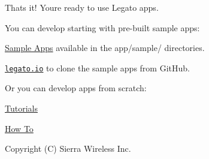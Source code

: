 That\textquotesingle{}s it! You\textquotesingle{}re ready to use Legato apps.

You can develop starting with pre-\/built sample apps\+: ~\newline

\begin{DoxyItemize}
\item \hyperlink{sampleApps}{Sample Apps} available in the app/sample/ directories.
\item \href{https://github.com/legatoproject/legato-af/tree/master/apps/sample}{\tt legato.\+io} to clone the sample apps from Git\+Hub.
\end{DoxyItemize}

Or you can develop apps from scratch\+:
\begin{DoxyItemize}
\item \hyperlink{getStartedApps}{Tutorials}
\item \hyperlink{howToMain}{How To}
\end{DoxyItemize}

Copyright (C) Sierra Wireless Inc. 
